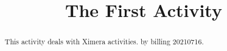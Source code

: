 \documentclass{ximera}
\title{The First Activity}
\begin{document}
  
\begin{abstract}  
This activity deals with Ximera activities.  
by billing 20210716.
\end{abstract}  
\maketitle  
\end{document}
